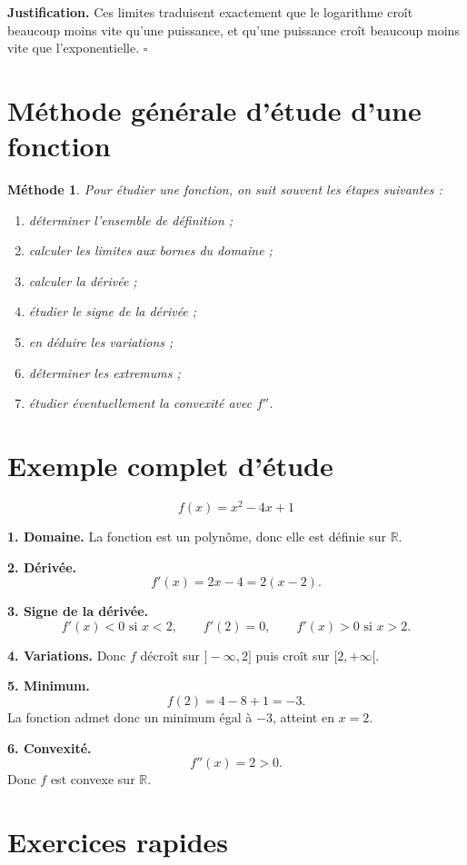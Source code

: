 \documentclass[11pt,a4paper]{article}
\newtheorem*{methode}{Méthode}
\newcommand{\R}{\mathbb{R}}
\begin{document}
\textbf{Justification.}  
Ces limites traduisent exactement que le logarithme croît beaucoup moins vite qu'une puissance, et qu'une puissance croît beaucoup moins vite que l'exponentielle. \(\square\)

\section{Méthode générale d'étude d'une fonction}

\begin{methode}
Pour étudier une fonction, on suit souvent les étapes suivantes :
\begin{enumerate}[label=\arabic*.]
    \item déterminer l'ensemble de définition ;
    \item calculer les limites aux bornes du domaine ;
    \item calculer la dérivée ;
    \item étudier le signe de la dérivée ;
    \item en déduire les variations ;
    \item déterminer les extremums ;
    \item étudier éventuellement la convexité avec \(f''\).
\end{enumerate}
\end{methode}

\section{Exemple complet d'étude}

\[
f(x)=x^2-4x+1
\]

\textbf{1. Domaine.}  
La fonction est un polynôme, donc elle est définie sur \(\R\).

\textbf{2. Dérivée.}
\[
f'(x)=2x-4=2(x-2).
\]

\textbf{3. Signe de la dérivée.}
\[
f'(x)<0 \text{ si } x<2,\qquad f'(2)=0,\qquad f'(x)>0 \text{ si } x>2.
\]

\textbf{4. Variations.}  
Donc \(f\) décroît sur \(]-\infty,2]\) puis croît sur \([2,+\infty[\).

\textbf{5. Minimum.}
\[
f(2)=4-8+1=-3.
\]
La fonction admet donc un minimum égal à \(-3\), atteint en \(x=2\).

\textbf{6. Convexité.}
\[
f''(x)=2>0.
\]
Donc \(f\) est convexe sur \(\R\).

\section{Exercices rapides}
\end{document}
